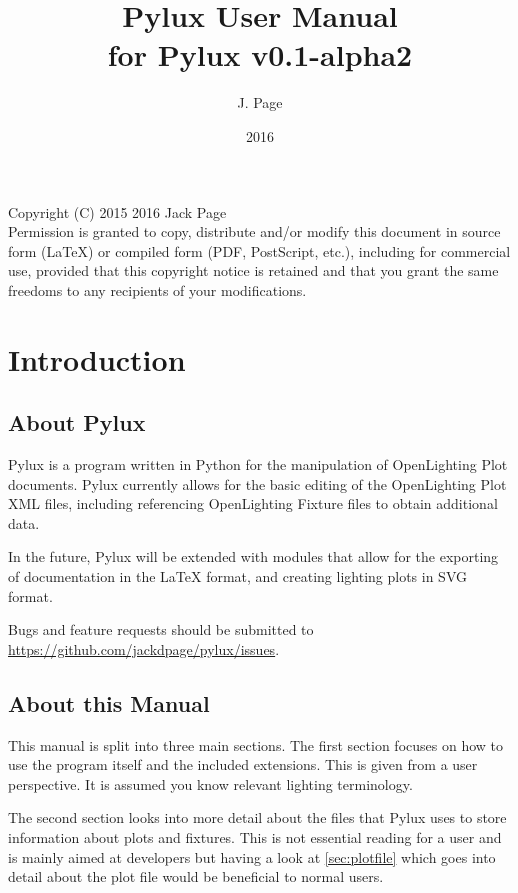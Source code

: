 \documentclass[a4paper]{article}
\begin{document}
\title{Pylux User Manual \\ \large{for Pylux v0.1-alpha2}}
\author{J. Page}
\date{2016}
\maketitle
\vspace{1.0pt}
Copyright (C)  2015 2016 Jack Page \\
Permission is granted to copy, distribute and/or modify this document
in source form (LaTeX) or compiled form (PDF, PostScript, etc.), including 
for commercial use, provided that this copyright notice is retained and that 
you grant the same freedoms to any recipients of your modifications.
\tableofcontents
\newpage
\section{Introduction}
\subsection{About Pylux}
Pylux is a program written in Python for the manipulation of OpenLighting Plot
documents. Pylux currently allows for the basic editing of the OpenLighting
Plot XML files, including referencing OpenLighting Fixture files to obtain
additional data.

In the future, Pylux will be extended with modules that allow for the exporting
of documentation in the \LaTeX{} format, and creating lighting plots in SVG 
format.

Bugs and feature requests should be submitted to 
\url{https://github.com/jackdpage/pylux/issues}.

\subsection{About this Manual}
This manual is split into three main sections. The first section focuses on 
how to use the program itself and the included extensions. This is given from 
a user perspective. It is assumed you know relevant lighting terminology.

The second section looks into more detail about the files that Pylux uses to 
store information about plots and fixtures. This is not essential reading for 
a user and is mainly aimed at developers but having a look at 
\autoref{sec:plotfile} which goes into detail about the plot file would be 
beneficial to normal users.
\end{document}
